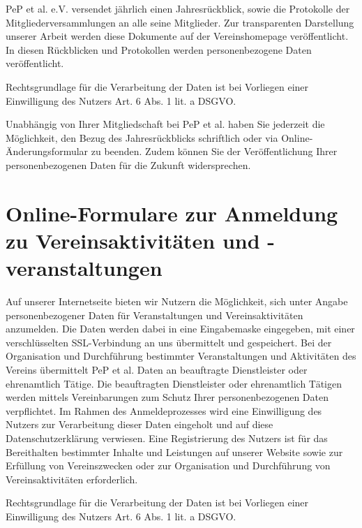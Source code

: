 \documentclass[
  fontsize=12pt,
  paper=a4,
  DIV14,
  parskip,
]{scrartcl}
\begin{document}
PeP et al. e.V. versendet jährlich einen Jahresrückblick, sowie die
Protokolle der Mitgliederversammlungen an alle seine Mitglieder. Zur
transparenten Darstellung unserer Arbeit werden diese Dokumente auf der
Vereinshomepage veröffentlicht.
In diesen Rückblicken und Protokollen werden personenbezogene Daten
veröffentlicht.

Rechtsgrundlage für die Verarbeitung der Daten ist bei Vorliegen einer
Einwilligung des Nutzers Art. 6 Abs. 1 lit. a DSGVO.

Unabhängig von Ihrer Mitgliedschaft bei PeP et al. haben Sie jederzeit die
Möglichkeit, den Bezug des Jahresrückblicks schriftlich oder via
Online-Änderungsformular zu beenden.
Zudem können Sie der Veröffentlichung Ihrer personenbezogenen Daten für die
Zukunft widersprechen.

\section{Online-Formulare zur Anmeldung zu Vereinsaktivitäten und -veranstaltungen}

Auf unserer Internetseite bieten wir Nutzern die Möglichkeit, sich unter
Angabe personenbezogener Daten für Veranstaltungen und Vereinsaktivitäten
anzumelden.
Die Daten werden dabei in eine Eingabemaske eingegeben, mit einer
verschlüsselten SSL-Verbindung an uns übermittelt und gespeichert.
Bei der Organisation und Durchführung bestimmter Veranstaltungen und
Aktivitäten des Vereins übermittelt PeP et al. Daten an beauftragte
Dienstleister oder ehrenamtlich Tätige.
Die beauftragten Dienstleister oder ehrenamtlich Tätigen werden mittels
Vereinbarungen zum Schutz Ihrer personenbezogenen Daten verpflichtet.
Im Rahmen des Anmeldeprozesses wird eine Einwilligung des Nutzers zur
Verarbeitung dieser Daten eingeholt und auf diese Datenschutzerklärung
verwiesen.
Eine Registrierung des Nutzers ist für das Bereithalten bestimmter Inhalte
und Leistungen auf unserer Website sowie zur Erfüllung von Vereinszwecken
oder zur Organisation und Durchführung von Vereinsaktivitäten erforderlich.

Rechtsgrundlage für die Verarbeitung der Daten ist bei Vorliegen einer
Einwilligung des Nutzers Art. 6 Abs. 1 lit. a DSGVO.
\end{document}
